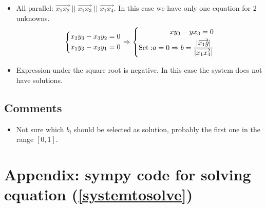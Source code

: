 \documentclass{article}
\begin{document}
\begin{landscape}
\begin{itemize}
        \item All parallel: $\overrightarrow{x_1x_2}\; ||\; \overrightarrow{x_1x_3} \;||\; \overrightarrow{x_1x_4}$. 
        In this case we have only one equation for 2 unknowns.
        \begin{equation}
            \left\{
            \begin{aligned}
                & x_2 y_3 - x_3 y_2 = 0 \\
                & x_1 y_3 - x_3 y_1 = 0 \\
            \end{aligned}
            \right.
            \Rightarrow
            \left\{
            \begin{aligned}
                x y_3 - y x_3 = 0\\
                {\rm Set: } a=0 \Rightarrow b=\frac{|\overrightarrow{x_1g}|}{|\overrightarrow{x_1x_4}|} \\
            \end{aligned}
            \right.
        \end{equation}

        \item Expression under the square root is negative. In this case the system does not have solutions.

    \end{itemize}

    \subsection*{Comments}
    \begin{itemize}
        \item Not sure which $b_i$ should be selected as solution, probably the first one in the range $[0, 1]$.
    \end{itemize}



    \section*{Appendix: sympy code for solving equation (\ref{systemtosolve})}
    \inputminted{python}{main.py}
   


\end{landscape}
\end{document}
